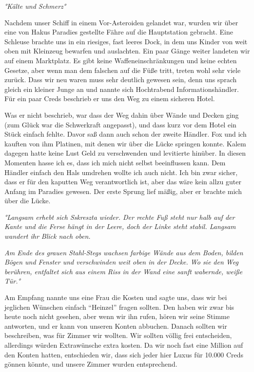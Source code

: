 \documentclass[11pt]{article}
\begin{document}
\emph{°Kälte und Schmerz°}

Nachdem unser Schiff in einem Vor-Asteroiden gelandet war, wurden wir
über eine von Hakus Paradies gestellte Fähre auf die Hauptstation
gebracht. Eine Schleuse brachte uns in ein riesiges, fast leeres Dock,
in dem uns Kinder von weit oben mit Kleinzeug bewarfen und auslachten.
Ein paar Gänge weiter landeten wir auf einem Marktplatz. Es gibt keine
Waffeneinschränkungen und keine echten Gesetze, aber wenn man dem
falschen auf die Füße tritt, treten wohl sehr viele zurück. Dass wir neu
waren muss sehr deutlich gewesen sein, denn uns sprach gleich ein
kleiner Junge an und nannte sich Hochtrabend Informationshändler. Für
ein paar Creds beschrieb er uns den Weg zu einem sicheren Hotel.

Was er nicht beschrieb, war dass der Weg dahin über Wände und Decken
ging (zum Glück war die Schwerkraft angepasst), und dass kurz vor dem
Hotel ein Stück einfach fehlte. Davor saß dann auch schon der zweite
Händler. Fox und ich kauften von ihm Platinen, mit denen wir über die
Lücke springen konnte. Kalem dagegen hatte keine Lust Geld zu
verschwenden und levitierte hinüber. In diesen Momenten hasse ich es,
dass ich mich nicht selbst beeinflussen kann. Dem Händler einfach den
Hals umdrehen wollte ich auch nicht. Ich bin zwar sicher, dass er für
den kaputten Weg verantwortlich ist, aber das wäre kein allzu guter
Anfang im Paradies gewesen. Der erste Sprung lief mäßig, aber er brachte
mich über die Lücke.

\emph{°Langsam erhebt sich Sskreszta wieder. Der rechte Fuß steht nur
halb auf der Kante und die Ferse hängt in der Leere, doch der Linke
steht stabil. Langsam wandert ihr Blick nach oben.}

\emph{Am Ende des grauen Stahl-Stegs wachsen farbige Wände aus dem
Boden, bilden Bögen und Fenster und verschwinden weit oben in der Decke.
Wo sie den Weg berühren, entfaltet sich aus einem Riss in der Wand eine
sanft wabernde, weiße Tür.°}

Am Empfang nannte uns eine Frau die Kosten und sagte uns, dass wir bei
jeglichen Wünschen einfach ``Heinzel'' fragen sollten. Den haben wir
zwar bis heute noch nicht gesehen, aber wenn wir ihn rufen, hören wir
seine Stimme antworten, und er kann von unseren Konten abbuchen. Danach
sollten wir beschreiben, was für Zimmer wir wollten. Wir sollten völlig
frei entscheiden, allerdings würden Extrawünsche extra kosten. Da wir
noch fast eine Million auf den Konten hatten, entschieden wir, dass sich
jeder hier Luxus für 10.000 Creds gönnen könnte, und unsere Zimmer
wurden entsprechend.
\end{document}
